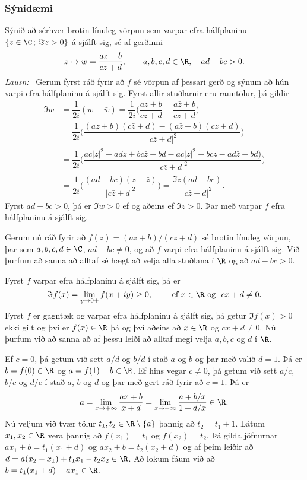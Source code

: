 \subsubsection{Sýnidæmi}   Sýnið að sérhver brotin línuleg vörpun
sem varpar efra hálfplaninu $\{z\in \C\,;\, \Im z>0\}$ á sjálft sig,
sé af gerðinni
$$
z\mapsto w=\dfrac{az+b}{cz+d}, \qquad a,b,c,d\in \R, \quad ad-bc>0.
$$
{\it Lausn:} \ Gerum fyrst ráð fyrir að $f$ sé vörpun af þessari gerð
og sýnum að hún varpi efra hálfplaninu á sjálft sig.  Fyrst allir
stuðlarnir eru rauntölur, þá gildir
\begin{align*}
\Im w&=\dfrac 1{2i}(w-\bar w)=
\dfrac 1{2i}\bigg(\dfrac{az+b}{cz+d}-\dfrac{a\bar z+b}{c\bar z+d}\bigg)\\
&=\dfrac 1{2i}\bigg(\dfrac{(az+b)(c\bar z+d)-(a\bar z+b)(cz+d)}
{|c\bar z+d|^2}\bigg)\\
&=\dfrac 1{2i}\bigg(\dfrac{ac|z|^2+adz+bc\bar z+bd-ac|z|^2-bcz-ad
\bar z-bd)}
{|c\bar z+d|^2}\bigg)\\
&=\dfrac 1{2i}\bigg(\dfrac{(ad-bc)(z-\bar z)}
{|c\bar z+d|^2}\bigg)=\dfrac{\Im z(ad-bc)}
{|c\bar z+d|^2}.
\end{align*}
Fyrst $ad-bc>0$, þá er $\Im w>0$ ef og aðeins ef $\Im z>0$.  Þar með
varpar $f$ efra hálfplaninu á sjálft sig.

\smallskip
Gerum nú ráð fyrir að $f(z)=(az+b)/(cz+d)$ sé brotin línuleg vörpun,
þar sem $a,b,c,d\in \C$, $ad-bc\neq 0$, og að $f$ varpi efra
hálfplaninu á sjálft sig. Við þurfum að sanna að  alltaf sé
hægt að velja alla stuðlana í $\R$ og að  $ad-bc>0$.

\smallskip
Fyrst $f$ varpar efra hálfplaninu á sjálft sig, þá er
$$
\Im f(x)=\lim_{y\to 0+}f(x+iy)\geq 0, \qquad \text{ ef } x\in \R
\ \text{og } \ cx+d\neq 0.
$$ 
Fyrst $f$ er gagntæk og  varpar efra hálfplaninu á sjálft sig,
þá getur $\Im f(x)>0$ ekki gilt og því er
$f(x)\in \R$ þá og því aðeins að $x\in \R$ og $cx+d\neq 0$.  
Nú þurfum við að sanna að
af þessu leiði að alltaf megi velja $a,b,c$ og $d$ í $\R$.

Ef $c=0$, þá getum við sett $a/d$ og $b/d$ í stað $a$ og $b$ og þar
með  valið $d=1$.  Þá er $b=f(0)\in \R$ og $a=f(1)-b\in \R$.  Ef hins vegar
$c\neq 0$, þá getum við sett $a/c$, $b/c$ og $d/c$ í stað $a$, $b$ og
$d$ og þar með gert ráð fyrir að $c=1$.  Þá er 
$$
a=\lim_{x\to +\infty}\dfrac{ax+b}{x+d}=\lim_{x\to
+\infty}\dfrac{a+b/x}{1+d/x}\in \R.
$$
Nú veljum við tvær tölur $t_1,t_2\in \R\setminus\{a\}$ þannig að 
$t_2=t_1+1$.  Látum $x_1,x_2\in \R$ vera þannig að
$f(x_1)=t_1$ og $f(x_2)=t_2$.  Þá gilda jöfnurnar
$ax_1+b=t_1(x_1+d)$ og $ax_2+b=t_2(x_2+d)$ og af þeim leiðir
að $d=a(x_2-x_1)+t_1x_1-t_2x_2\in \R$.  Að lokum fáum við að
$b=t_1(x_1+d)-ax_1 \in \R$.

